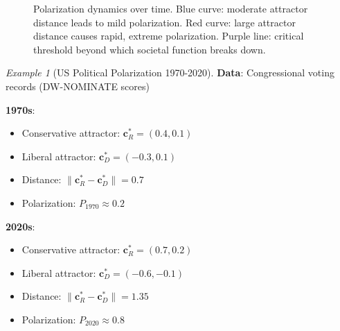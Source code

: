 \documentclass[11pt,a4paper]{article}
\theoremstyle{definition}
\theoremstyle{remark}
\newtheorem{example}{Example}[section]
\newcommand{\cc}{\mathbf{c}}
\begin{document}
\begin{enumerate}
\begin{figure}[H]
\caption{Polarization dynamics over time. Blue curve: moderate attractor distance leads to mild polarization. Red curve: large attractor distance causes rapid, extreme polarization. Purple line: critical threshold beyond which societal function breaks down.}
\label{fig:polarization_dynamics}
\end{figure}

\begin{example}[US Political Polarization 1970-2020]
\textbf{Data}: Congressional voting records (DW-NOMINATE scores)

\textbf{1970s}:
\begin{itemize}
    \item Conservative attractor: \(\cc^*_R = (0.4, 0.1)\)
    \item Liberal attractor: \(\cc^*_D = (-0.3, 0.1)\)
    \item Distance: \(\|\cc^*_R - \cc^*_D\| = 0.7\)
    \item Polarization: \(P_{1970} \approx 0.2\)
\end{itemize}

\textbf{2020s}:
\begin{itemize}
    \item Conservative attractor: \(\cc^*_R = (0.7, 0.2)\)
    \item Liberal attractor: \(\cc^*_D = (-0.6, -0.1)\)
    \item Distance: \(\|\cc^*_R - \cc^*_D\| = 1.35\)
    \item Polarization: \(P_{2020} \approx 0.8\)
\end{itemize}


\end{example}
\end{enumerate}
\end{document}
